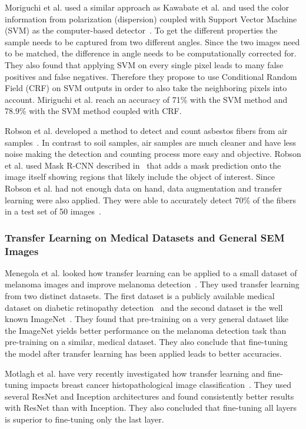 Moriguchi et al. used a similar approach as Kawabate et al. and used the color information from polarization (dispersion) coupled with Support Vector Machine (SVM) as the computer-based detector~\cite{moriguchi2008asbestos}. To get the different properties the sample needs to be captured from two different angles. Since the two images need to be matched, the difference in angle needs to be computationally corrected for. They also found that applying SVM on every single pixel leads to many false positives and false negatives. Therefore they propose to use Conditional Random Field (CRF) on SVM outputs in order to also take the neighboring pixels into account. Miriguchi et al. reach an accuracy of 71\% with the SVM method and 78.9\% with the SVM method coupled with CRF.

Robson et al. developed a method to detect and count asbestos fibers from air samples~\cite{robson2018fiac}. In contrast to soil samples, air samples are much cleaner and have less noise making the detection and counting process more easy and objective. Robson et al. used Mask R-CNN described in~\cite{he2017mask} that adds a mask prediction onto the image itself showing regions that likely include the object of interest. Since Robson et al. had not enough data on hand, data augmentation and transfer learning were also applied. They were able to accurately detect 70\% of the fibers in a test set of 50 images~\cite{robson2018fiac}. \\

\subsubsection{Transfer Learning on Medical Datasets and General SEM Images}

Menegola et al. looked how transfer learning can be applied to a small dataset of melanoma images and improve melanoma detection~\cite{menegola2017knowledge}. They used transfer learning from two distinct datasets. The first dataset is a publicly available medical dataset on diabetic retinopathy detection~\cite{diabeticRetinopathy} and the second dataset is the well known ImageNet~\cite{imagenet}. They found that pre-training on a very general dataset like the ImageNet yields better performance on the melanoma detection task than pre-training on a similar, medical dataset. They also conclude that fine-tuning the model after transfer learning has been applied leads to better accuracies.

Motlagh et al. have very recently investigated how transfer learning and fine-tuning impacts breast cancer histopathological image classification~\cite{motlagh2018breast}. They used several ResNet and Inception architectures and found consistently better results with ResNet than with Inception. They also concluded that fine-tuning all layers is superior to fine-tuning only the last layer.

